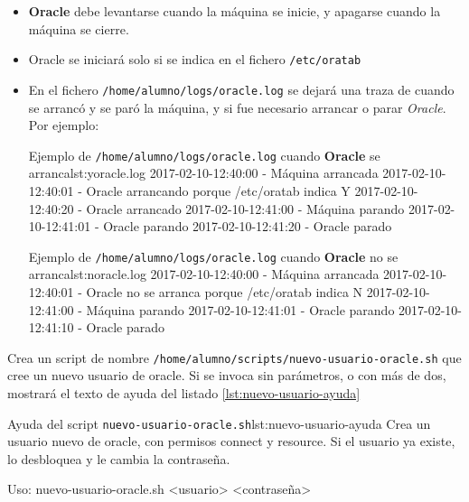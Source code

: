 \begin{homeworkProblem}

  \begin{itemize}
  \item \textbf{Oracle} debe levantarse cuando la máquina se inicie, y apagarse cuando la máquina se cierre.
  \item Oracle se iniciará solo si se indica en el fichero \texttt{/etc/oratab}
  
  \item En el fichero \texttt{/home/alumno/logs/oracle.log} se dejará una traza de cuando se arrancó y se paró la máquina, y si fue necesario arrancar o parar \textit{Oracle}. Por ejemplo:
    
    \begin{listadotxt}{Ejemplo de \texttt{/home/alumno/logs/oracle.log} cuando \textbf{Oracle} se arranca}{lst:yoracle.log}
      2017-02-10-12:40:00 - Máquina arrancada
      2017-02-10-12:40:01 - Oracle arrancando porque /etc/oratab indica Y
      2017-02-10-12:40:20 - Oracle arrancado
      2017-02-10-12:41:00 - Máquina parando
      2017-02-10-12:41:01 - Oracle parando
      2017-02-10-12:41:20 - Oracle parado
    \end{listadotxt}

    \begin{listadotxt}{Ejemplo de \texttt{/home/alumno/logs/oracle.log} cuando \textbf{Oracle} no se arranca}{lst:noracle.log}
      2017-02-10-12:40:00 - Máquina arrancada
      2017-02-10-12:40:01 - Oracle no se arranca porque /etc/oratab indica N
      2017-02-10-12:41:00 - Máquina parando
      2017-02-10-12:41:01 - Oracle parando
      2017-02-10-12:41:10 - Oracle parado
    \end{listadotxt}

    
  \end{itemize}
  
\end{homeworkProblem}

\begin{homeworkProblem}
  Crea un script de nombre \texttt{/home/alumno/scripts/nuevo-usuario-oracle.sh} que cree un nuevo usuario de oracle. Si se invoca sin parámetros, o con más de dos, mostrará el texto de ayuda del listado \ref{lst:nuevo-usuario-ayuda}

  \begin{listadotxt}{Ayuda del script \texttt{nuevo-usuario-oracle.sh}}{lst:nuevo-usuario-ayuda}
  Crea un usuario nuevo de oracle, con permisos connect y resource.
  Si el usuario ya existe, lo desbloquea y le cambia la contraseña.
  
  Uso: nuevo-usuario-oracle.sh <usuario> <contraseña>
  \end{listadotxt}
\end{homeworkProblem}


